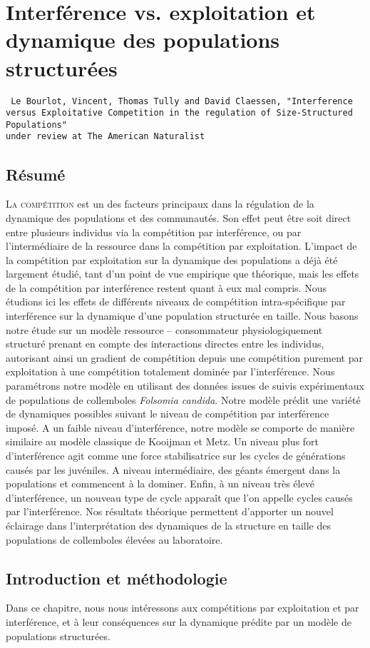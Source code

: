 \chapter[Interférence vs. exploitation et dynamique des populations
structurées][Interférence et populations structurées]{Interférence vs.
exploitation et dynamique des populations structurées}
\label{chap:amnat}

\vspace{2cm}
\begin{Spacing}{1}
\texttt{
Le Bourlot, Vincent, Thomas Tully and David Claessen, "Interference versus
Exploitative Competition in the regulation of Size-Structured Populations"\\
under review at The American Naturalist
}
\end{Spacing}

\section*{Résumé}


\lettrine[lines=3]{L}{a compétition}  est un des facteurs principaux dans la
régulation de la dynamique des populations et des communautés. Son effet peut
être soit direct entre plusieurs individus via la compétition par
interférence, ou par l'intermédiaire de la ressource dans la compétition par
exploitation. L'impact de la compétition par exploitation sur la dynamique des
populations a déjà été largement étudié, tant d'un point de vue empirique
que théorique, mais les effets de la compétition par interférence restent
quant à eux mal compris. Nous étudions ici les effets de différents niveaux
de compétition intra-spécifique par interférence sur la dynamique d'une
population structurée en taille. Nous basons notre étude sur un modèle
ressource -- consommateur physiologiquement structuré prenant en compte des
interactions directes entre les individus, autorisant ainsi un gradient de
compétition depuis une compétition purement par exploitation à une
compétition totalement dominée par l'interférence. Nous paramétrons notre
modèle en utilisant des données issues de suivis expérimentaux de populations
de collemboles \textit{Folsomia candida}. Notre modèle prédit une variété de
dynamiques possibles suivant le niveau de compétition par interférence
imposé. A un faible niveau d'interférence, notre modèle se comporte de
manière similaire au modèle classique de Kooijman et Metz. Un niveau plus fort
d'interférence agit comme une force stabilisatrice sur les cycles de
générations causés par les juvéniles. A niveau intermédiaire, des géants
émergent dans la populations et commencent à la dominer. Enfin, à un niveau
très élevé d'interférence, un nouveau type de cycle apparaît que l'on
appelle cycles causés par l'interférence. Nos résultats théorique permettent
d'apporter un nouvel éclairage dans l'interprétation des dynamiques de la
structure en taille des populations de collemboles élevées au laboratoire.

\section{Introduction et méthodologie}

Dans ce chapitre, nous nous intéressons aux compétitions par exploitation et
par interférence, et à leur conséquences sur la dynamique prédite par un modèle
de populations structurées.


